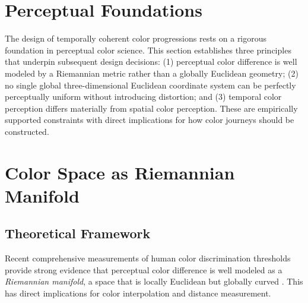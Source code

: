 
\section{Perceptual Foundations}
\label{sec:perceptual-foundations}

The design of temporally coherent color progressions rests on a rigorous foundation in perceptual color science. This section establishes three principles that underpin subsequent design decisions: (1) perceptual color difference is well modeled by a Riemannian metric rather than a globally Euclidean geometry; (2) no single global three-dimensional Euclidean coordinate system can be perfectly perceptually uniform without introducing distortion; and (3) temporal color perception differs materially from spatial color perception. These are empirically supported constraints with direct implications for how color journeys should be constructed.

\section{Color Space as Riemannian Manifold}
\label{sec:riemannian-color}

\subsection{Theoretical Framework}

Recent comprehensive measurements of human color discrimination thresholds provide strong evidence that perceptual color difference is well modeled as a \emph{Riemannian manifold}, a space that is locally Euclidean but globally curved \citep{hong2025}. This has direct implications for color interpolation and distance measurement.

